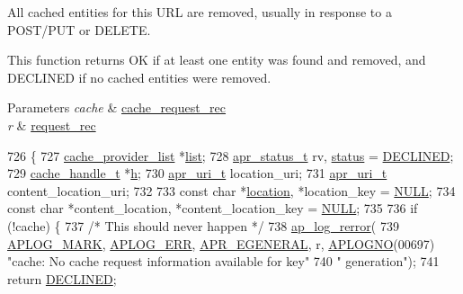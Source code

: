 All cached entities for this U\+RL are removed, usually in response to a P\+O\+S\+T/\+P\+UT or D\+E\+L\+E\+TE.

This function returns OK if at least one entity was found and removed, and D\+E\+C\+L\+I\+N\+ED if no cached entities were removed. 
\begin{DoxyParams}{Parameters}
{\em cache} & \hyperlink{structcache__request__rec}{cache\+\_\+request\+\_\+rec} \\
\hline
{\em r} & \hyperlink{structrequest__rec}{request\+\_\+rec} \\
\hline
\end{DoxyParams}

\begin{DoxyCode}
726 \{
727     \hyperlink{structcache__provider__list}{cache\_provider\_list} *\hyperlink{group__APACHE__CORE__PROTO_gaeb6b944e4524f915483b5696b7f2f424}{list};
728     \hyperlink{group__apr__errno_gaa5105fa83cc322f09382292db8b47593}{apr\_status\_t} rv, \hyperlink{group__APACHE__CORE__HTTPD_ga6e27f49150e9a14580fb313cc2777e00}{status} = \hyperlink{group__APACHE__CORE__DAEMON_ga9eba11ca86461a3ae319311d64682dda}{DECLINED};
729     \hyperlink{structcache__handle}{cache\_handle\_t} *\hyperlink{group__apr__hash_ga0d6dcb41ca5e794b318df5f6fd273ee2}{h};
730     \hyperlink{structapr__uri__t}{apr\_uri\_t} location\_uri;
731     \hyperlink{structapr__uri__t}{apr\_uri\_t} content\_location\_uri;
732 
733     \textcolor{keyword}{const} \textcolor{keywordtype}{char} *\hyperlink{pcre_8txt_ab5ae715589dddf66b4d1eeb056186268}{location}, *location\_key = \hyperlink{pcre_8txt_ad7f989d16aa8ca809a36bc392c07fba1}{NULL};
734     \textcolor{keyword}{const} \textcolor{keywordtype}{char} *content\_location, *content\_location\_key = \hyperlink{pcre_8txt_ad7f989d16aa8ca809a36bc392c07fba1}{NULL};
735 
736     \textcolor{keywordflow}{if} (!cache) \{
737         \textcolor{comment}{/* This should never happen */}
738         \hyperlink{group__APACHE__CORE__LOG_ga4c112558ccffd6b363da102b2052d2a6}{ap\_log\_rerror}(
739                 \hyperlink{group__APACHE__CORE__LOG_ga655e126996849bcb82e4e5a14c616f4a}{APLOG\_MARK}, \hyperlink{group__APACHE__CORE__LOG_ga57ad94ed8c92c4306de90479251a5d58}{APLOG\_ERR}, \hyperlink{group__APR__Error_ga18f5678bea0c2c704a2b6a186c9e158b}{APR\_EGENERAL}, r, 
      \hyperlink{group__APACHE__CORE__LOG_ga1dee8a07e06bc5b3de8b89662c2cd666}{APLOGNO}(00697) \textcolor{stringliteral}{"cache: No cache request information available for key"}
740                 \textcolor{stringliteral}{" generation"});
741         \textcolor{keywordflow}{return} \hyperlink{group__APACHE__CORE__DAEMON_ga9eba11ca86461a3ae319311d64682dda}{DECLINED};

\end{DoxyCode}
